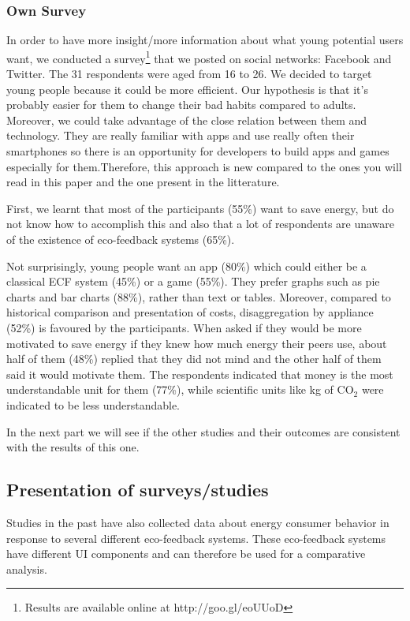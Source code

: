 \documentclass[journal]{vgtc}                %
\begin{document}
\subsubsection{Own Survey}

In order to have more insight/more information about what young potential users want, we conducted a survey\footnote{Results are available online at {http://goo.gl/eoUUoD}} that we posted on social networks: Facebook and Twitter.
The 31 respondents were aged from 16 to 26.%
We decided to target young people because it could be more efficient. Our hypothesis is that it's probably easier for them to change their bad habits compared to adults. Moreover, we could take advantage of the close relation between them and technology. They are really familiar with apps and use really often their smartphones so there is an opportunity for developers to build apps and games especially for them.Therefore, this approach is new compared to the ones you will read in this paper and the one present in the litterature.

First, we learnt that most of the participants (55\%) want to save energy, but do not know how to accomplish this and also that a lot of respondents are unaware of the existence of eco-feedback systems (65\%).
 
Not surprisingly, young people want an app (80\%) which could either be a classical ECF system (45\%) or a game (55\%).
They prefer graphs such as pie charts and bar charts (88\%), rather than text or tables. 
Moreover, compared to historical comparison and presentation of costs, disaggregation by appliance (52\%) is favoured by the participants.
When asked if they would be more motivated to save energy if they knew how much energy their peers use, about half of them (48\%) replied that they did not mind and the other half of them said it would motivate them.
The respondents indicated that money is the most understandable unit for them (77\%), while scientific units like kg of CO$_2$ were indicated to be less understandable.

In the next part we will see if the other studies and their outcomes are consistent with the results of this one.



\subsection{Presentation of surveys/studies} %
Studies in the past have also collected data about energy consumer behavior in response to several different eco-feedback systems. These eco-feedback systems have different UI components and can therefore be used for a comparative analysis.
\end{document}
